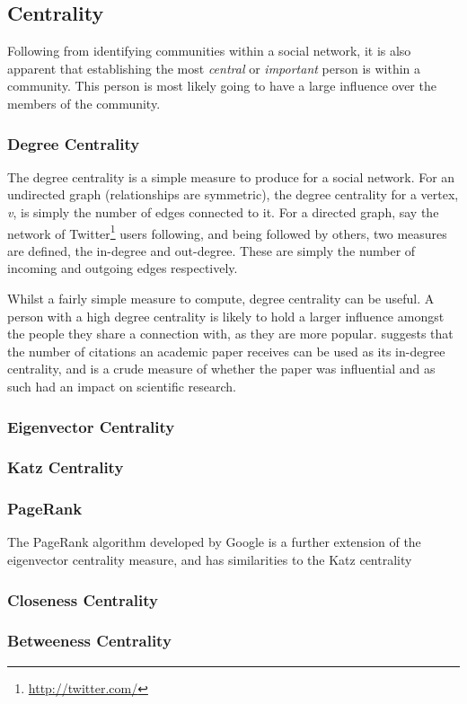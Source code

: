 \subsection{Centrality}
Following from identifying communities within a social network, it is also apparent that establishing the most \emph{central} or \emph{important} person is within a community. This person is most likely going to have a large influence over the members of the community.

\subsubsection{Degree Centrality}
The degree centrality is a simple measure to produce for a social network. For an undirected graph (relationships are symmetric), the degree centrality for a vertex, \emph{v}, is simply the number of edges connected to it. For a directed graph, say the network of Twitter\footnote{\url{http://twitter.com/}} users following, and being followed by others, two measures are defined, the in-degree and out-degree. These are simply the number of incoming and outgoing edges respectively.

Whilst a fairly simple measure to compute, degree centrality can be useful. A person with a high degree centrality is likely to hold a larger influence amongst the people they share a connection with, as they are more popular. \cite[p.~169]{newman10} suggests that the number of citations an academic paper receives can be used as its in-degree centrality, and is a crude measure of whether the paper was influential and as such had an impact on scientific research.

\subsubsection{Eigenvector Centrality}

\subsubsection{Katz Centrality}
\cite{katz53}

\subsubsection{PageRank}
The PageRank algorithm \cite{pagerank} developed by Google is a further extension of the eigenvector centrality measure, and has similarities to the Katz centrality 

\subsubsection{Closeness Centrality}

\subsubsection{Betweeness Centrality}

